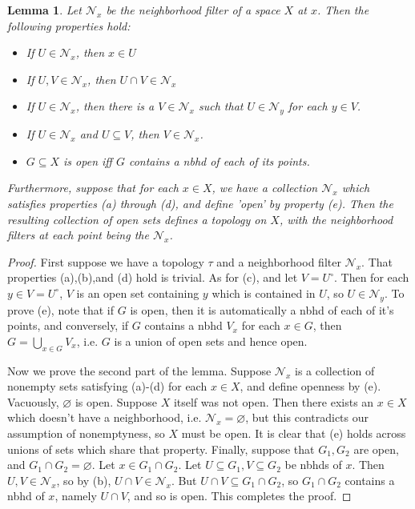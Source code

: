 \documentclass{article}
\theoremstyle{definition}
\theoremstyle{plain}
\theoremstyle{theorem}
\newtheorem{lemma}{Lemma}[section]
\begin{document}
	\begin{lemma}
		Let $\mathcal{N}_x$ be the neighborhood filter of a space $X$ at $x$. Then the following properties hold:
		\begin{itemize}
			\item[(a)] If $U \in \mathcal{N}_x$, then $x \in U$
			\item[(b)] If $U,V \in \mathcal{N}_x$, then $U \cap V \in \mathcal{N}_x$
			\item[(c)]If $U \in \mathcal{N}_x$, then there is a $V \in \mathcal{N}_x$ such that $U \in \mathcal{N}_y$ for each $y \in V$.
			\item[(d)] If $U \in \mathcal{N}_x$ and $U \subseteq V$, then $V \in \mathcal{N}_x$. 
			\item[(e)] $G \subseteq X$ is open iff $G$ contains a nbhd of each of its points.
		\end{itemize}
		Furthermore, suppose that for each $x \in X$, we have a collection $\mathcal{N}_x$ which satisfies properties (a) through (d), and define 'open' by property (e). Then the resulting collection of open sets defines a topology on $X$, with the neighborhood filters at each point being the $\mathcal{N}_x$.
	\end{lemma}
	\begin{proof}
		First suppose we have a topology $\tau$ and a neighborhood filter $\mathcal{N}_x$. That properties (a),(b),and (d) hold is trivial. As for (c), and let $V = U^{\circ}$. Then for each $y \in V = U^{\circ}$, $V$ is an open set containing $y$ which is contained in $U$, so $U \in \mathcal{N}_y$. To prove (e), note that if $G$ is open, then it is automatically a nbhd of each of it's points, and conversely, if $G$ contains a nbhd $V_x$ for each $x \in G$, then $G = \bigcup_{x \in G} V_x$, i.e. $G$ is a union of open sets and hence open. 
		\par Now we prove the second part of the lemma. Suppose $\mathcal{N}_x$ is a collection of nonempty sets satisfying (a)-(d) for each $x \in X$, and define openness by (e). Vacuously, $\varnothing$ is open. Suppose $X$ itself was not open. Then there exists an $x \in X$ which doesn't have a neighborhood, i.e. $\mathcal{N}_x = \varnothing$, but this contradicts our assumption of nonemptyness, so $X$ must be open.
		 It is clear that (e) holds across unions of sets which share that property. Finally, suppose that $G_1,G_2$ are open, and $G_1 \cap G_2 = \varnothing$. Let $x \in G_1 \cap G_2$. Let $U \subseteq G_1, V \subseteq G_2$ be nbhds of $x$. Then $U,V \in \mathcal{N}_x$, so by (b), $U \cap V \in \mathcal{N}_x$. But $U \cap V \subseteq G_1 \cap G_2$, so $G_1 \cap G_2$ contains a nbhd of $x$, namely $U \cap V$, and so is open. This completes the proof.
	\end{proof}
\end{document}
